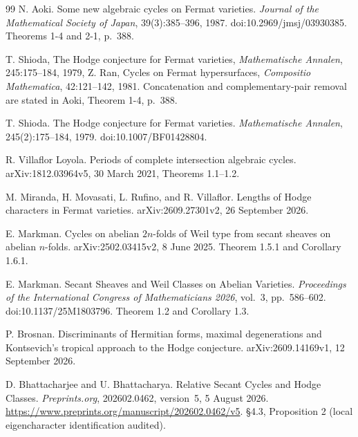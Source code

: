 {\begin{thebibliography}{99}
N. Aoki.
\newblock Some new algebraic cycles on Fermat varieties.
\newblock \emph{Journal of the Mathematical Society of Japan}, 39(3):385--396, 1987.
\newblock doi:10.2969/jmsj/03930385.
\newblock Theorems 1-4 and 2-1, p.~388.


T. Shioda, The Hodge conjecture for Fermat varieties,
\emph{Mathematische Annalen}, 245:175--184, 1979,
Z. Ran, Cycles on Fermat hypersurfaces,
\emph{Compositio Mathematica}, 42:121--142, 1981.
\newblock Concatenation and complementary-pair removal are stated in
Aoki, Theorem 1-4, p.~388.


T. Shioda.
\newblock The Hodge conjecture for Fermat varieties.
\newblock \emph{Mathematische Annalen}, 245(2):175--184, 1979.
\newblock doi:10.1007/BF01428804.


R. Villaflor Loyola.
\newblock Periods of complete intersection algebraic cycles.
\newblock arXiv:1812.03964v5, 30 March 2021, Theorems 1.1--1.2.


M. Miranda, H. Movasati, L. Rufino, and R. Villaflor.
\newblock Lengths of Hodge characters in Fermat varieties.
\newblock arXiv:2609.27301v2, 26 September 2026.


E. Markman.
\newblock Cycles on abelian $2n$-folds of Weil type from secant sheaves on abelian $n$-folds.
\newblock arXiv:2502.03415v2, 8 June 2025.
\newblock Theorem 1.5.1 and Corollary 1.6.1.


E. Markman.
\newblock Secant Sheaves and Weil Classes on Abelian Varieties.
\newblock \emph{Proceedings of the International Congress of Mathematicians 2026},
vol.~3, pp.~586--602.
\newblock doi:10.1137/25M1803796.
\newblock Theorem 1.2 and Corollary 1.3.


P. Brosnan.
\newblock Discriminants of Hermitian forms, maximal degenerations and Kontsevich's tropical approach to the Hodge conjecture.
\newblock arXiv:2609.14169v1, 12 September 2026.


D. Bhattacharjee and U. Bhattacharya.
\newblock Relative Secant Cycles and Hodge Classes.
\newblock \emph{Preprints.org}, 202602.0462, version~5, 5 August 2026.
\newblock \url{https://www.preprints.org/manuscript/202602.0462/v5}.
\newblock \S4.3, Proposition 2 (local eigencharacter identification audited).



\end{thebibliography}}
